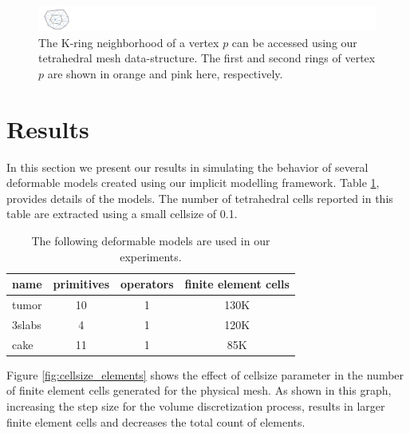 \begin{figure}[H]
  \centering
  \includegraphics[width=7.0\linewidth]{figures/deformable/kring.pdf}
  \caption{\label{fig:kring}
  {The K-ring neighborhood of a vertex $p$ can be accessed using our tetrahedral mesh 
  data-structure. The first and second rings of vertex $p$ are shown in orange and pink here, respectively.}
}
\end{figure}


\section{Results}
In this section we present our results in simulating the behavior of several deformable models created 
using our implicit modelling framework. Table \ref{table:deformablemodels}, provides details of the 
models. The number of tetrahedral cells reported in this table are extracted using a small cellsize of 0.1. 

\begin{table}[H]
\begin{center}
\caption{\label{table:deformablemodels}
{The following deformable models are used in our experiments.}}
  \begin{tabular}{ | l | c | c | c | }
    \hline    
    name & primitives & operators & finite element cells \\ \hline \hline    
    tumor & 10 & 1 & 130K \\ \hline
    3slabs & 4 & 1 & 120K \\ \hline
    cake & 11 & 1 & 85K \\ \hline
    \hline
  \end{tabular}
\end{center}
\end{table}

Figure \ref{fig:cellsize_elements} shows the effect of cellsize parameter in the number of finite element 
cells generated for the physical mesh. As shown in this graph, increasing the step size for the volume 
discretization process, results in larger finite element cells and decreases the total count of elements.

